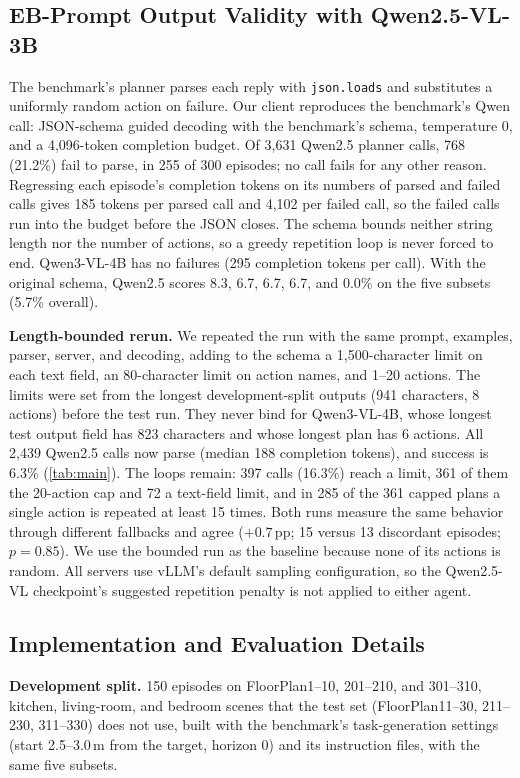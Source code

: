 \subsection{EB-Prompt Output Validity with Qwen2.5-VL-3B}
\label{app:qwen25}
The benchmark's planner parses each reply with \texttt{json.loads} and substitutes a uniformly random action on
failure. Our client reproduces the benchmark's Qwen call: JSON-schema guided decoding with the benchmark's schema,
temperature 0, and a 4{,}096-token completion budget. Of 3{,}631 Qwen2.5 planner calls, 768 (21.2\%) fail to
parse, in 255 of 300 episodes; no call fails for any other reason. Regressing each episode's completion tokens on
its numbers of parsed and failed calls gives 185 tokens per parsed call and 4{,}102 per failed call, so the failed
calls run into the budget before the JSON closes. The schema bounds neither string length nor the number of actions,
so a greedy repetition loop is never forced to end. Qwen3-VL-4B has no failures (295 completion tokens per call).
With the original schema, Qwen2.5 scores 8.3, 6.7, 6.7, 6.7, and 0.0\% on the five subsets (5.7\% overall).

\noindent\textbf{Length-bounded rerun.}
We repeated the run with the same prompt, examples, parser, server, and decoding, adding to the schema a
1{,}500-character limit on each text field, an 80-character limit on action names, and 1--20 actions. The limits
were set from the longest development-split outputs (941 characters, 8 actions) before the test run. They never
bind for Qwen3-VL-4B, whose longest test output field has 823 characters and whose longest plan has 6 actions. All
2{,}439 Qwen2.5 calls now parse (median 188 completion tokens), and success is 6.3\% (\cref{tab:main}). The loops
remain: 397 calls (16.3\%) reach a limit, 361 of them the 20-action cap and 72 a text-field limit, and in 285 of
the 361 capped plans a single action is repeated at least 15 times. Both runs measure the same behavior through different fallbacks and agree
($+0.7$\,pp; 15 versus 13 discordant episodes; $p=0.85$). We use the bounded run as the baseline because none of its
actions is random. All servers use vLLM's default sampling configuration, so the Qwen2.5-VL checkpoint's suggested
repetition penalty is not applied to either agent.

\subsection{Implementation and Evaluation Details}
\label{app:impl}
\noindent\textbf{Development split.} 150 episodes on FloorPlan1--10, 201--210, and 301--310, kitchen, living-room,
and bedroom scenes that the test set (FloorPlan11--30, 211--230, 311--330) does not use, built with the benchmark's task-generation settings (start 2.5--3.0\,m from the
target, horizon 0) and its instruction files, with the same five subsets.

